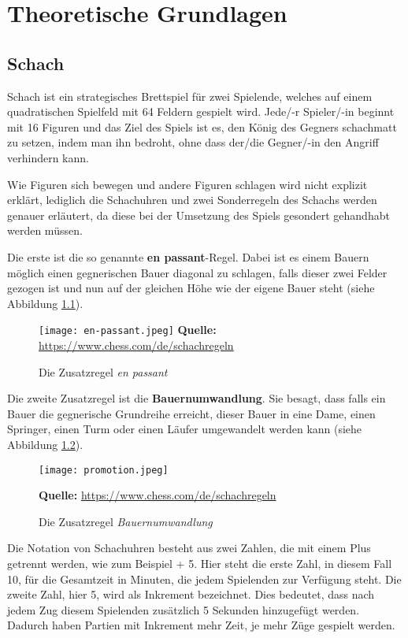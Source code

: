 \chapter{Theoretische Grundlagen}
    \section{Schach}
    \label{sec:schach-theorie}
   Schach ist ein strategisches Brettspiel für zwei Spielende, welches auf einem quadratischen Spielfeld mit 64 Feldern gespielt wird. Jede/-r Spieler/-in beginnt mit 16 Figuren und das Ziel des Spiels ist es, den König des Gegners schachmatt zu setzen, indem man ihn bedroht, ohne dass der/die Gegner/-in den Angriff verhindern kann. 
   
   Wie Figuren sich bewegen und andere Figuren schlagen wird nicht explizit erklärt, lediglich die Schachuhren und zwei Sonderregeln des Schachs werden genauer erläutert, da diese bei der Umsetzung des Spiels gesondert gehandhabt werden müssen.
   
   Die erste ist die so genannte \textbf{en passant}-Regel. Dabei ist es einem Bauern möglich einen gegnerischen Bauer diagonal zu schlagen, falls dieser zwei Felder gezogen ist und nun auf der gleichen Höhe wie der eigene Bauer steht (siehe Abbildung \ref{fig:en-passant}).
   
        \begin{figure}[!htb]
\raggedleft
  \texttt{[image: en-passant.jpeg]}
    \footnotesize\sffamily\textbf{Quelle:} \url{https://www.chess.com/de/schachregeln}
  \caption{Die Zusatzregel \textit{en passant}}
  \label{fig:en-passant}
\end{figure}

   Die zweite Zusatzregel ist die \textbf{Bauernumwandlung}. Sie besagt, dass falls ein Bauer die gegnerische Grundreihe erreicht, dieser Bauer in eine Dame, einen Springer, einen Turm oder einen Läufer umgewandelt werden kann (siehe Abbildung \ref{fig:promotion}).
   
  \begin{figure}[!htb]
\centering
  \texttt{[image: promotion.jpeg]}
   
   
\raggedleft
    \footnotesize\sffamily\textbf{Quelle:} \url{https://www.chess.com/de/schachregeln}
  \caption{Die Zusatzregel \textit{Bauernumwandlung}}
  \label{fig:promotion}
\end{figure}

Die Notation von Schachuhren besteht aus zwei Zahlen, die mit einem Plus getrennt werden, wie zum Beispiel  + 5\grqq .  Hier steht die erste Zahl, in diesem Fall 10, für die Gesamtzeit in Minuten, die jedem Spielenden zur Verfügung steht. Die zweite Zahl, hier 5, wird als Inkrement bezeichnet. Dies bedeutet, dass nach jedem Zug diesem Spielenden zusätzlich 5 Sekunden hinzugefügt werden. Dadurch haben Partien mit Inkrement mehr Zeit, je mehr Züge gespielt werden.

